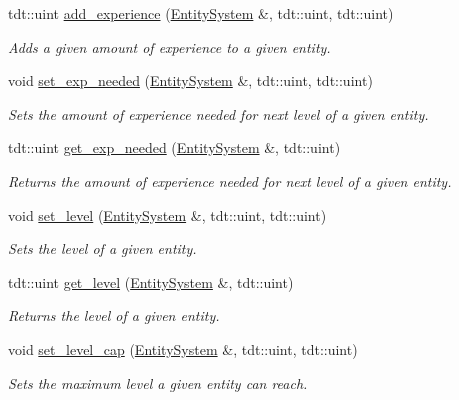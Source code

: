 \begin{DoxyCompactItemize}
tdt\+::uint \hyperlink{namespace_upgrade_helper_ad9c77904122af9c9842635e8e18aced8}{add\+\_\+experience} (\hyperlink{class_entity_system}{Entity\+System} \&, tdt\+::uint, tdt\+::uint)
\begin{DoxyCompactList}\small\item\em Adds a given amount of experience to a given entity. \end{DoxyCompactList}\item 
void \hyperlink{namespace_upgrade_helper_a520d765b3e655515da22fda424cc576d}{set\+\_\+exp\+\_\+needed} (\hyperlink{class_entity_system}{Entity\+System} \&, tdt\+::uint, tdt\+::uint)
\begin{DoxyCompactList}\small\item\em Sets the amount of experience needed for next level of a given entity. \end{DoxyCompactList}\item 
tdt\+::uint \hyperlink{namespace_upgrade_helper_ac75bd935dac9dcd1594fb4c53ca9a41c}{get\+\_\+exp\+\_\+needed} (\hyperlink{class_entity_system}{Entity\+System} \&, tdt\+::uint)
\begin{DoxyCompactList}\small\item\em Returns the amount of experience needed for next level of a given entity. \end{DoxyCompactList}\item 
void \hyperlink{namespace_upgrade_helper_a0cd1a5e0de739717c3216a3162d729da}{set\+\_\+level} (\hyperlink{class_entity_system}{Entity\+System} \&, tdt\+::uint, tdt\+::uint)
\begin{DoxyCompactList}\small\item\em Sets the level of a given entity. \end{DoxyCompactList}\item 
tdt\+::uint \hyperlink{namespace_upgrade_helper_adca2425354e6327c18c214edd88ee786}{get\+\_\+level} (\hyperlink{class_entity_system}{Entity\+System} \&, tdt\+::uint)
\begin{DoxyCompactList}\small\item\em Returns the level of a given entity. \end{DoxyCompactList}\item 
void \hyperlink{namespace_upgrade_helper_a514551c9295c6ca9050cd9fbec8a50ab}{set\+\_\+level\+\_\+cap} (\hyperlink{class_entity_system}{Entity\+System} \&, tdt\+::uint, tdt\+::uint)
\begin{DoxyCompactList}\small\item\em Sets the maximum level a given entity can reach. \end{DoxyCompactList}\item 

\end{DoxyCompactItemize}
